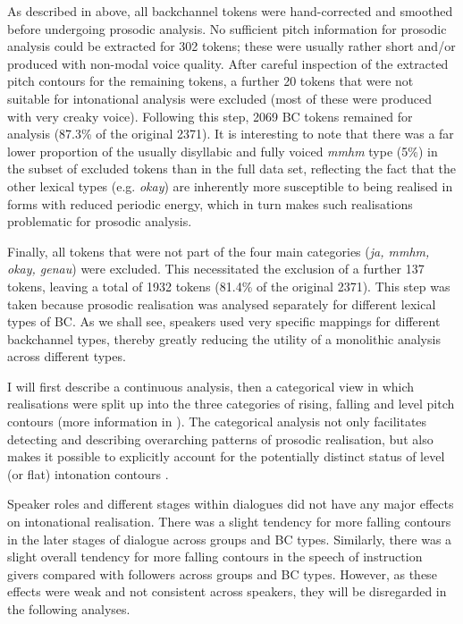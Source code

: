 As described in  above, all backchannel tokens were hand-corrected and smoothed before undergoing prosodic analysis. No sufficient pitch information for prosodic analysis could be extracted for 302 tokens; these were usually rather short and/or produced with non-modal voice quality. After careful inspection of the extracted pitch contours for the remaining tokens, a further 20 tokens that were not suitable for intonational analysis were excluded (most of these were produced with very creaky voice).  Following this step, 2069 BC tokens remained for analysis (87.3\% of the original 2371). It is interesting to note that there was a far lower proportion of the usually disyllabic and fully voiced \emph{mmhm} type (5\%) in the subset of excluded tokens than in the full data set, reflecting the fact that the other lexical types (e.g. \emph{okay}) are inherently more susceptible to being realised in forms with reduced periodic energy, which in turn makes such realisations problematic for prosodic analysis.

Finally, all tokens that were not part of the four main categories (\emph{ja, mmhm, okay, genau}) were excluded. This necessitated the exclusion of a further 137 tokens, leaving a total of 1932 tokens (81.4\% of the original 2371). This step was taken because prosodic realisation was analysed separately for different lexical types of BC. As we shall see, speakers used very specific mappings for different backchannel types, thereby greatly reducing the utility of a monolithic analysis across different types.

I will first describe a continuous analysis, then a categorical view in which realisations were split up into the three categories of rising, falling and level pitch contours (more information in ). The categorical analysis not only facilitates detecting and describing overarching patterns of prosodic realisation, but also makes it possible to explicitly account for the potentially distinct status of level (or flat) intonation contours \citep[see ; cf.][]{griceIntegratingDiscretenessContinuity2017,sbrannaBackchannellingLanguagesRate2022}.

Speaker roles and different stages within dialogues did not have any major effects on intonational realisation. There was a slight tendency for more falling contours in the later stages of dialogue across groups and BC types. Similarly, there was a slight overall tendency for more falling contours in the speech of instruction givers compared with followers across groups and BC types. However, as these effects were weak and not consistent across speakers, they will be disregarded in the following analyses.

